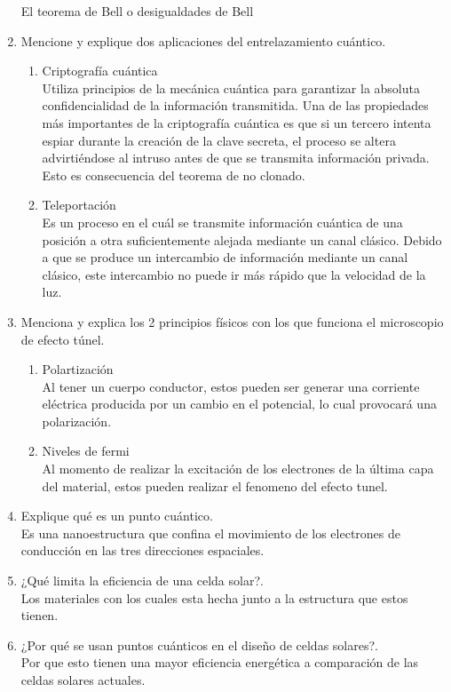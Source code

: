 \documentclass[12pt,letterpaper]{report}
\begin{document}
\begin{enumerate}
    El teorema de Bell o desigualdades de Bell
    \item Mencione y explique dos aplicaciones del entrelazamiento cuántico.
    \begin{enumerate}
        \item Criptografía cuántica\\
        Utiliza principios de la mecánica cuántica para garantizar la absoluta confidencialidad de la información transmitida.
        Una de las propiedades más importantes de la criptografía cuántica es que si un tercero intenta espiar durante la creación de la clave secreta, el proceso se altera advirtiéndose al intruso antes de que se transmita información privada. Esto es consecuencia del teorema de no clonado.
        \item Teleportación\\
        Es un proceso en el cuál se transmite información cuántica de una posición a otra suficientemente alejada mediante un canal clásico. Debido a que se produce un intercambio de información mediante un canal clásico, este intercambio no puede ir más rápido que la velocidad de la luz.
    \end{enumerate}
    \item Menciona y explica los 2 principios físicos con los que funciona el microscopio de efecto túnel.
    \begin{enumerate}
        \item Polartización\\
        Al tener un cuerpo conductor, estos pueden ser generar una corriente eléctrica producida por un cambio en el potencial, lo cual provocará una polarización.
        \item Niveles de fermi\\
        Al momento de realizar la excitación de los electrones de la última capa del material, estos pueden realizar el fenomeno del efecto tunel.
    \end{enumerate}
    \item Explique qué es un punto cuántico.\\
    Es una nanoestructura que confina el movimiento de los electrones de conducción en las tres direcciones espaciales.
    \item ¿Qué limita la eficiencia de una celda solar?.\\
    Los materiales con los cuales esta hecha junto a la estructura que estos tienen.
    \item ¿Por qué se usan puntos cuánticos en el diseño de celdas solares?.\\
    Por que esto tienen una mayor eficiencia energética a comparación de las celdas solares actuales.
\end{enumerate}
\end{document}
